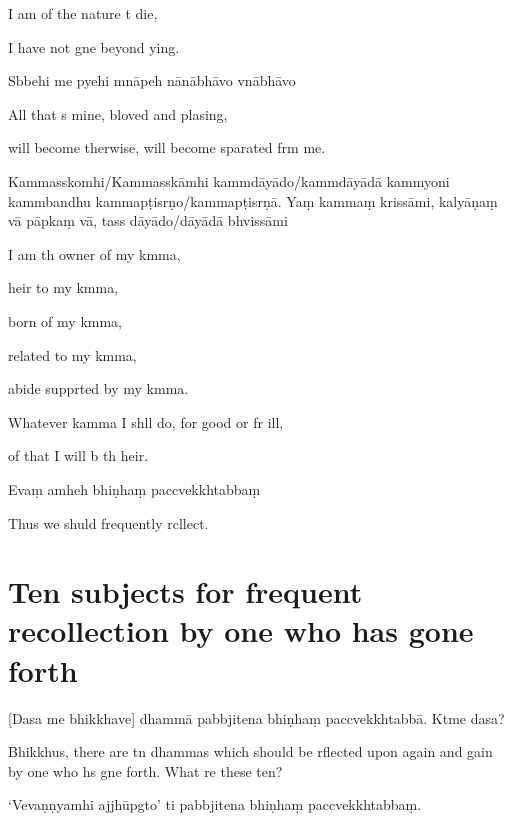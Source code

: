 I am of the nature t die,

I have not gne beyond ying.

Sbbehi me pyehi mnāpeh nānābhāvo vnābhāvo

All that s mine, bloved and plasing,

will become therwise, will become sparated frm me.

Kammasskomhi/Kammasskāmhi kammdāyādo/kammdāyādā kammyoni kammbandhu kammapṭisrṇo/kammapṭisrṇā. Yaṃ kammaṃ krissāmi, kalyāṇaṃ vā pāpkaṃ vā, tass dāyādo/dāyādā bhvissāmi

I am th owner of my kmma,

heir to my kmma,

born of my kmma,

related to my kmma,

abide supprted by my kmma.

Whatever kamma I shll do, for good or fr ill,

of that I will b th heir.

Evaṃ amheh bhiṇhaṃ paccvekkhtabbaṃ

Thus we shuld frequently rcllect.

\chapter[Ten Subjects]{Ten subjects for frequent recollection by one who has gone forth}

\begin{leader}
\end{leader}

[Dasa me bhikkhave] dhammā pabbjitena bhiṇhaṃ
paccvekkhtabbā. Ktme dasa?

\begin{english}
Bhikkhus, there are tn dhammas which should be rflected upon
again and gain by one who hs gne forth. What re
these ten?
\end{english}

`Vevaṇṇyamhi ajjhūpgto' ti pabbjitena
bhiṇhaṃ paccvekkhtabbaṃ.

